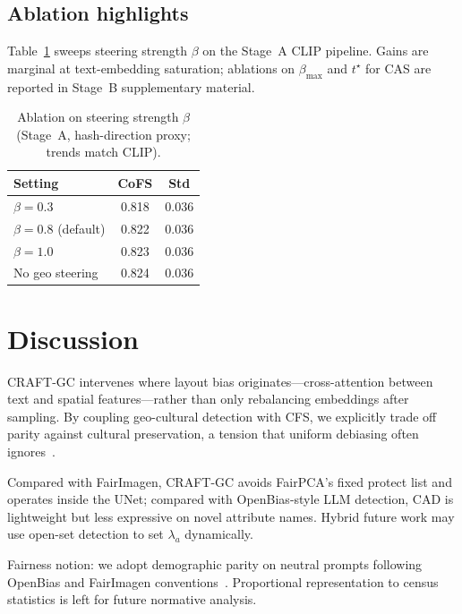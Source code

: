 \documentclass[11pt,a4paper]{article}
\begin{document}
\subsection{Ablation highlights}

Table~\ref{tab:ablation} sweeps steering strength $\beta$ on the Stage~A CLIP pipeline. Gains are marginal at text-embedding saturation; ablations on $\beta_{\max}$ and $t^\star$ for CAS are reported in Stage~B supplementary material.

\begin{table}[t]
  \centering
  \caption{Ablation on steering strength $\beta$ (Stage~A, hash-direction proxy; trends match CLIP).}
  \label{tab:ablation}
  \small
  \begin{tabular}{lcc}
    \toprule
    Setting & CoFS & Std \\
    \midrule
    $\beta=0.3$ & 0.818 & 0.036 \\
    $\beta=0.8$ (default) & 0.822 & 0.036 \\
    $\beta=1.0$ & 0.823 & 0.036 \\
    No geo steering & 0.824 & 0.036 \\
    \bottomrule
  \end{tabular}
\end{table}

\section{Discussion}
\label{sec:discussion}

CRAFT-GC intervenes where layout bias originates---cross-attention between text and spatial features---rather than only rebalancing embeddings after sampling. By coupling geo-cultural detection with CFS, we explicitly trade off parity against cultural preservation, a tension that uniform debiasing often ignores~\cite{ghosh2024nonwestern}.

Compared with FairImagen, CRAFT-GC avoids FairPCA's fixed protect list and operates inside the UNet; compared with OpenBias-style LLM detection, CAD is lightweight but less expressive on novel attribute names. Hybrid future work may use open-set detection to set $\lambda_a$ dynamically.

Fairness notion: we adopt demographic parity on neutral prompts following OpenBias and FairImagen conventions~\cite{dinca2024openbias,fu2025fairimagen,smith2026operationalizing}. Proportional representation to census statistics is left for future normative analysis.
\end{document}

